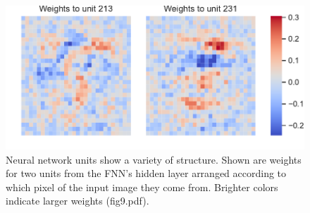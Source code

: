 \documentclass{article}
\begin{document}
\noindent \\
\begin{figure}[H]
        \centering
        \includegraphics{fig8.pdf}
        \caption[width=7in]{
        Neural network units show a variety of structure. Shown are weights for two units from the FNN's hidden layer arranged according to which pixel of the input image they come from. Brighter colors indicate larger weights (fig9.pdf).}
        \label{zfigure8}
\end{figure}
\end{document}
